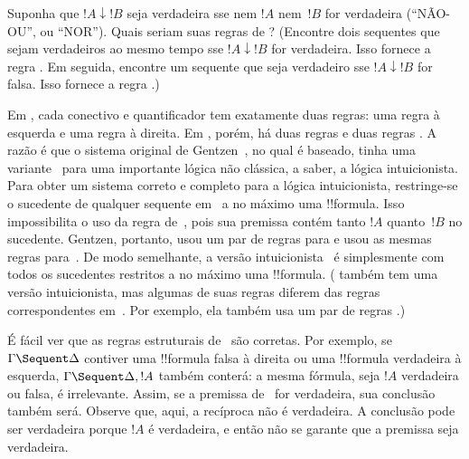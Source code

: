 \documentclass[../../../include/open-logic-section]{subfiles}
\begin{document}
\begin{prob}
Suponha que $!A \downarrow !B$ seja verdadeira sse nem $!A$ nem~$!B$
for verdadeira (``NÃO-OU'', ou ``NOR''). Quais seriam suas regras de ?
(Encontre dois sequentes que sejam verdadeiros ao mesmo tempo sse $!A
\downarrow !B$ for verdadeira. Isso fornece a regra
\RightR{\downarrow}. Em seguida, encontre um sequente que seja
verdadeiro sse $!A \downarrow !B$ for falsa. Isso fornece a regra
\LeftR{\downarrow}.)
\end{prob}

Em , cada conectivo e quantificador tem exatamente duas regras:
uma regra à esquerda e uma regra à direita. Em , porém, há
duas regras \LeftR{\land} e duas regras \RightR{\lor}. A razão é que o
sistema original de Gentzen~, no qual  é baseado,
tinha uma variante~ para uma importante lógica não clássica, a
saber, a lógica intuicionista. Para obter um sistema correto e completo
para a lógica intuicionista, restringe-se o sucedente de qualquer
sequente em~ a no máximo uma !!{formula}. Isso impossibilita o
uso da regra \RightR{\lor} de~, pois sua premissa contém tanto
$!A$ quanto~$!B$ no sucedente. Gentzen, portanto, usou um par de regras
\RightR{\lor} para  e usou as mesmas regras para~. De
modo semelhante, a versão intuicionista~ é simplesmente
 com todos os sucedentes restritos a no máximo uma
!!{formula}. ( também tem uma versão intuicionista, mas algumas
de suas regras diferem das regras correspondentes em~. Por
exemplo, ela também usa um par de regras \RightR{\lor}.)

É fácil ver que as regras estruturais de~ são corretas. Por
exemplo, se $\Gamma \Sequent \Delta$ contiver uma !!{formula} falsa à
direita ou uma !!{formula} verdadeira à esquerda, $\Gamma \Sequent
\Delta, !A$ também conterá: a mesma fórmula, seja $!A$ verdadeira ou
falsa, é irrelevante. Assim, se a premissa de~\RightR{\Weakening} for
verdadeira, sua conclusão também será. Observe que, aqui, a recíproca
não é verdadeira. A conclusão pode ser verdadeira porque $!A$ é
verdadeira, e então não se garante que a premissa seja verdadeira.
\end{document}
